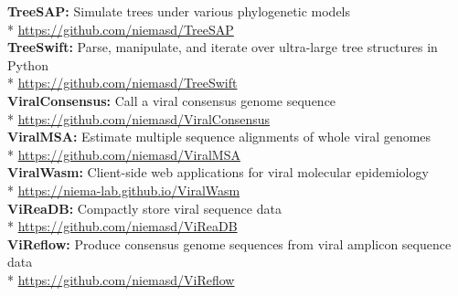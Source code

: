 \documentclass[margin,line]{res}
\begin{document}
\begin{resume}
\textbf{TreeSAP:} Simulate trees under various phylogenetic models\\*\vspace{2mm}
\hspace*{4mm} \href{https://github.com/niemasd/TreeSAP}{https://github.com/niemasd/TreeSAP}\\
\textbf{TreeSwift:} Parse, manipulate, and iterate over ultra-large tree structures in Python\\*\vspace{2mm}
\hspace*{4mm} \href{https://github.com/niemasd/TreeSwift}{https://github.com/niemasd/TreeSwift}\\
\textbf{ViralConsensus:} Call a viral consensus genome sequence\\*\vspace{2mm}
\hspace*{4mm} \href{https://github.com/niemasd/ViralConsensus}{https://github.com/niemasd/ViralConsensus}\\
\textbf{ViralMSA:} Estimate multiple sequence alignments of whole viral genomes\\*\vspace{2mm}
\hspace*{4mm} \href{https://github.com/niemasd/ViralMSA}{https://github.com/niemasd/ViralMSA}\\
\textbf{ViralWasm:} Client-side web applications for viral molecular epidemiology\\*\vspace{2mm}
\hspace*{4mm} \href{https://niema-lab.github.io/ViralWasm}{https://niema-lab.github.io/ViralWasm}\\
\textbf{ViReaDB:} Compactly store viral sequence data\\*\vspace{2mm}
\hspace*{4mm} \href{https://github.com/niemasd/ViReaDB}{https://github.com/niemasd/ViReaDB}\\
\textbf{ViReflow:} Produce consensus genome sequences from viral amplicon sequence data\\*\vspace{2mm}
\hspace*{4mm} \href{https://github.com/niemasd/ViralMSA}{https://github.com/niemasd/ViReflow}\\


\end{resume}
\end{document}
